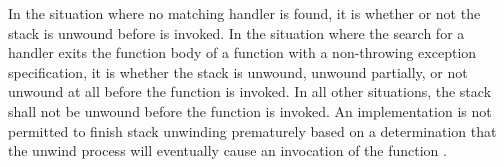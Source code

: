\pnum
{}%
In the situation where no matching handler is found, it is
whether or not the stack is unwound
before  is invoked.
In the situation where the search for a handler
exits the function body of a function
with a non-throwing exception specification, it is
whether the stack is unwound, unwound partially, or not unwound at all
before the function  is invoked.
In all other situations, the stack shall not be unwound before
the function 
is invoked.
An implementation is not permitted to finish stack unwinding
prematurely based on a determination that the unwind process
will eventually cause an invocation of the function
.
